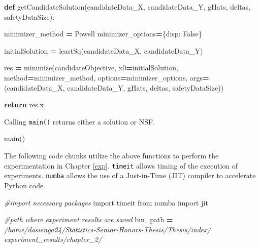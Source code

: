 \documentclass[12pt, twoside]{amherstthesis}
\newenvironment{Shaded}{\begin{snugshade}}{\end{snugshade}}
\newcommand{\CommentTok}[1]{\textcolor[rgb]{0.56,0.35,0.01}{\textit{#1}}}
\newcommand{\ControlFlowTok}[1]{\textcolor[rgb]{0.13,0.29,0.53}{\textbf{#1}}}
\newcommand{\ImportTok}[1]{#1}
\newcommand{\KeywordTok}[1]{\textcolor[rgb]{0.13,0.29,0.53}{\textbf{#1}}}
\newcommand{\NormalTok}[1]{#1}
\newcommand{\OperatorTok}[1]{\textcolor[rgb]{0.81,0.36,0.00}{\textbf{#1}}}
\newcommand{\StringTok}[1]{\textcolor[rgb]{0.31,0.60,0.02}{#1}}
\newcommand{\VariableTok}[1]{\textcolor[rgb]{0.00,0.00,0.00}{#1}}
\begin{document}
\begin{Shaded}
\begin{Highlighting}[]
\KeywordTok{def}\NormalTok{ getCandidateSolution(candidateData\_X, candidateData\_Y, gHats, deltas, }
\NormalTok{safetyDataSize):}
  
\NormalTok{    minimizer\_method }\OperatorTok{=} \StringTok{\textquotesingle{}Powell\textquotesingle{}}
\NormalTok{    minimizer\_options}\OperatorTok{=}\NormalTok{\{}\StringTok{\textquotesingle{}disp\textquotesingle{}}\NormalTok{: }\VariableTok{False}\NormalTok{\}}

\NormalTok{    initialSolution }\OperatorTok{=}\NormalTok{ leastSq(candidateData\_X, candidateData\_Y)}

\NormalTok{    res }\OperatorTok{=}\NormalTok{ minimize(candidateObjective, x0}\OperatorTok{=}\NormalTok{initialSolution, }
\NormalTok{    method}\OperatorTok{=}\NormalTok{minimizer\_method, options}\OperatorTok{=}\NormalTok{minimizer\_options, }
\NormalTok{    args}\OperatorTok{=}\NormalTok{(candidateData\_X, candidateData\_Y, gHats, deltas, safetyDataSize))}

    \ControlFlowTok{return}\NormalTok{ res.x}
\end{Highlighting}
\end{Shaded}
\noindent Calling \texttt{main()} returns either a solution or NSF.
\begin{Shaded}
\begin{Highlighting}[]
\NormalTok{main()}
\end{Highlighting}
\end{Shaded}
\noindent The following code chunks utilize the above functions to perform the experimentation in Chapter \ref{exp}. \texttt{timeit} allows timing of the execution of experiments. \texttt{numba} allows the use of a Just-in-Time (JIT) compiler to accelerate Python code.
\begin{Shaded}
\begin{Highlighting}[]
\CommentTok{\#import necessary packages}
\ImportTok{import}\NormalTok{ timeit               }
\ImportTok{from}\NormalTok{ numba }\ImportTok{import}\NormalTok{ jit       }
\end{Highlighting}
\end{Shaded}
\begin{Shaded}
\begin{Highlighting}[]
\CommentTok{\#path where experiment results are saved}
\NormalTok{bin\_path }\OperatorTok{=} 
\CommentTok{\textquotesingle{}/home/dasienga24/Statistics{-}Senior{-}Honors{-}Thesis/Thesis/index/\textquotesingle{}}
\CommentTok{\textquotesingle{}experiment\_results/chapter\_2/\textquotesingle{}}
\end{Highlighting}
\end{Shaded}
\end{document}
